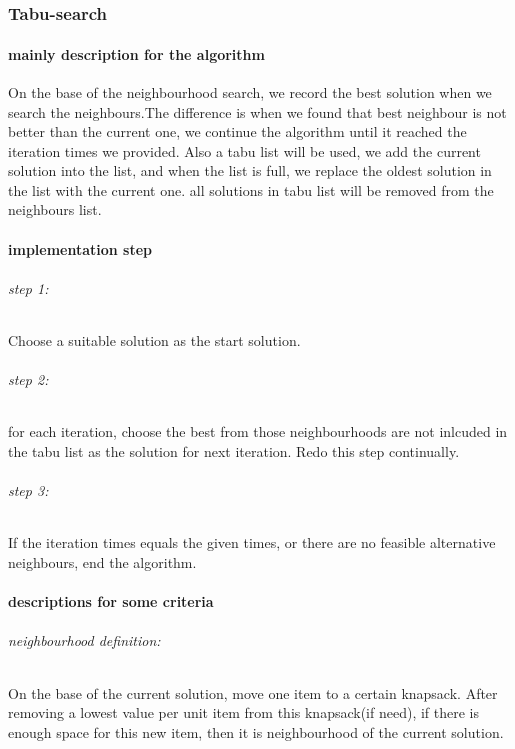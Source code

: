 \documentclass{article}
\begin{document}
\part{}
\section{Tabu-search}
\subsection{mainly description for the algorithm}
On the base of the neighbourhood search, we record the best solution when we search the neighbours.The difference is when we found that best neighbour is not better than the current one, we continue the algorithm until it reached the iteration times we provided. Also a tabu list will be used, we add the current solution into the list, and when the list is full, we replace the oldest solution in the list with the current one. all solutions in tabu list will be removed from the neighbours list.
\subsection{implementation step}

\paragraph{step 1:} Choose a suitable solution as the start solution.
\paragraph{step 2:} for each iteration, choose the best from those neighbourhoods are not inlcuded in the tabu list as the solution for next iteration. Redo this step continually.
\paragraph{step 3:} If the iteration times equals the given times, or there are no feasible alternative neighbours, end the algorithm.

\subsection{descriptions for some criteria}
\paragraph{neighbourhood definition:}On the base of the current solution, move one item to a certain knapsack. After removing a lowest value per unit item from this knapsack(if need), if there is enough space for this new item, then it is neighbourhood of the current solution.
\end{document}
